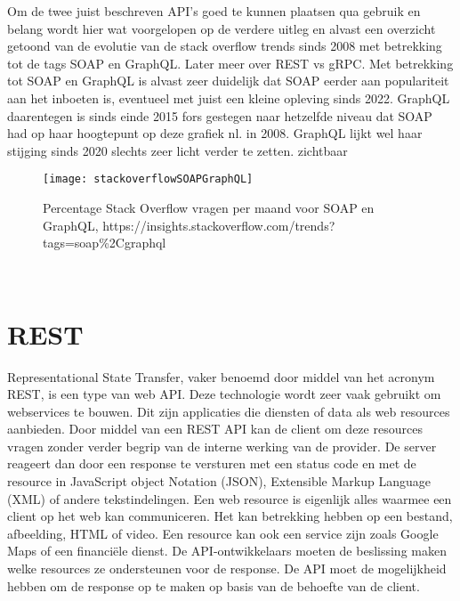 Om de twee juist beschreven API's goed te kunnen plaatsen qua gebruik en belang wordt hier wat voorgelopen op de verdere uitleg en alvast een overzicht getoond van de evolutie van de
stack overflow trends sinds 2008 met betrekking tot de tags SOAP en GraphQL. Later meer over REST vs gRPC. Met betrekking tot SOAP en GraphQL is alvast zeer duidelijk dat SOAP eerder
aan populariteit aan het inboeten is, eventueel met juist een kleine opleving sinds 2022. GraphQL daarentegen is sinds einde 2015 fors gestegen naar hetzelfde niveau dat SOAP had
op haar hoogtepunt op deze grafiek nl. in 2008. GraphQL lijkt wel haar stijging sinds 2020 slechts zeer licht verder te zetten.
zichtbaar
\begin{figure}[ht]
    \centering
    \texttt{[image: stackoverflowSOAPGraphQL]}
    \caption{Percentage Stack Overflow vragen per maand voor SOAP en GraphQL,\newline
    https://insights.stackoverflow.com/trends?tags=soap\%2Cgraphql}
\end{figure}\\
\nocite{stackoverflowSOAPGraphQL}


\section{REST}

Representational State Transfer, vaker benoemd door middel van het acronym REST, is een type van web API. Deze technologie wordt zeer vaak gebruikt om webservices te bouwen.
Dit zijn applicaties die diensten of data als web resources aanbieden. Door middel van een REST API kan de client om deze resources vragen zonder verder
begrip van de interne werking van de provider. De server reageert dan door een response te versturen met een status code en met de resource in JavaScript object Notation (JSON),
Extensible Markup Language (XML) of andere tekstindelingen. Een web resource is eigenlijk alles waarmee een client op het web kan communiceren.
Het kan betrekking hebben op een bestand, afbeelding, HTML of video. Een resource kan ook een service zijn zoals Google Maps of een financi\"ele dienst.
De API-ontwikkelaars moeten de beslissing maken welke resources ze ondersteunen voor de response.
De API moet de mogelijkheid hebben om de response op te maken op basis van de behoefte van de client.
~\autocite{uptrends}
~\autocite{guru99-webservices}\\

